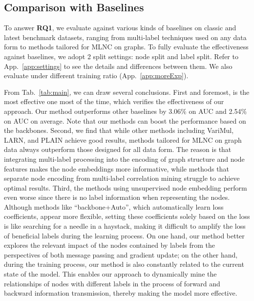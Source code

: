  
\subsection{Comparison with Baselines}
To answer \textbf{RQ1}, we evaluate \model against various kinds of baselines on classic and latest benchmark datasets, ranging from multi-label techniques used on any data form to methods tailored for MLNC on graphs.
To fully evaluate the effectiveness against baselines, we adopt 2 split settings: node split and label split. 
Refer to App.~\ref{app:settings} to see the details and differences between them.
We also evaluate under different training ratio (App.~\ref{app:moreExp}).

From Tab.~\ref{tab:main}, we can draw several conclusions. 
First and foremost, \model is the most effective one most of the time, which verifies the effectiveness of our approach. 
Our method outperforms other baselines by 3.06\% on AUC and 2.54\% on AUC on average.
Note that our methods can boost the performance based on the backbones. 
Second, we find that while other methods including VariMul, LARN, and PLAIN achieve good results, methods tailored for MLNC on graph data always outperform those designed for all data form. 
The reason is that integrating multi-label processing into the encoding of graph structure and node features makes the node embeddings more informative, while methods that separate node encoding from multi-label correlation mining struggle to achieve optimal results. 
Third, the methods using unsupervised node embedding perform even worse since there is no label information when representing the nodes. 
Although methods like ``backbone+Auto'', which automatically learn loss coefficients, appear more flexible, setting these coefficients solely based on the loss is like searching for a needle in a haystack, making it difficult to amplify the loss of beneficial labels during the learning process.
On one hand, our method better explores the relevant impact of the nodes contained by labels from the perspectives of both message passing and gradient update; on the other hand, during the training process, our method is also constantly related to the current state of the model. This enables our approach to dynamically mine the relationships of nodes with different labels in the process of forward and backward information transmission, thereby making the model more effective.


